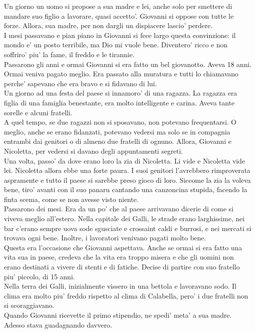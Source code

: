 Un giorno un uomo si propose a sua madre e lei, anche solo per smettere di mandare suo figlio a lavorare, quasi accetto'. Giovanni si oppose con tutte le forze. Allora, sua madre, per non dargli un dispiacere lascio' perdere.\\

I mesi passavano e pian piano in Giovanni si fece largo questa convinzione: il mondo e' un posto terribile, ma Dio mi vuole bene. Diventero' ricco e non soffriro' piu' la fame, il freddo e le tirannie.\\
  Passarono gli anni e ormai Giovanni si era fatto un bel giovanotto. Aveva 18 anni. Ormai veniva pagato meglio. Era passato alla muratura e tutti lo chiamavano perche' sapevano che era bravo e si fidavano di lui.\\

Un giorno ad una festa del paese si innamoro' di una ragazza. La ragazza era figlia di una famiglia benestante, era molto intelligente e carina. Aveva tante sorelle e alcuni fratelli. \\

A quel tempo, se due ragazzi non si sposavano, non potevano frequentarsi. O meglio, anche se erano fidanzati, potevano vedersi ma solo se in compagnia entrambi dai genitori o di almeno due fratelli di ognuno. Allora, Giovanni e Nicoletta, per vedersi si davano degli appuntamenti segreti.\\
 Una volta, passo' da dove erano loro la zia di Nicoletta. Li vide e Nicoletta vide lei. Nicoletta allora ebbe una forte paura. I suoi genitori l'avrebbero rimproverata aspramente e tutto il paese si sarebbe preso gioco di loro. Siccome la zia la voleva bene, tiro' avanti con il suo panaru cantando una canzoncina stupida, facendo la finta scema, come se non avesse visto niente.\\

Passarono dei mesi. Era da un po' che al paese arrivavano dicerie di come si viveva meglio all'estero. Nella capitale dei Galli, le strade erano larghissime, nei bar c'erano sempre uova sode sgusciate e crossaint caldi e burrosi, e nei mercati si trovava ogni bene. Inoltre, i lavoratori venivano pagati molto bene.\\

Questa era l'occasione che Giovanni aspettava. Anche se ormai si era fatto una vita sua in paese, credeva che la vita era troppo misera e che gli uomini non erano destinati a vivere di stenti e di fatiche. Decise di partire con suo fratello piu' piccolo, di 15 anni.\\
Nella terra dei Galli, inizialmente vissero in una bettola e lavoravano sodo. Il clima era molto piu' freddo rispetto al clima di Calabella, pero' i due fratelli non si scoraggiavano. \\
Quando Giovanni ricevette il primo stipendio, ne spedi' meta' a sua madre. Adesso stava guadagnando davvero.\\


